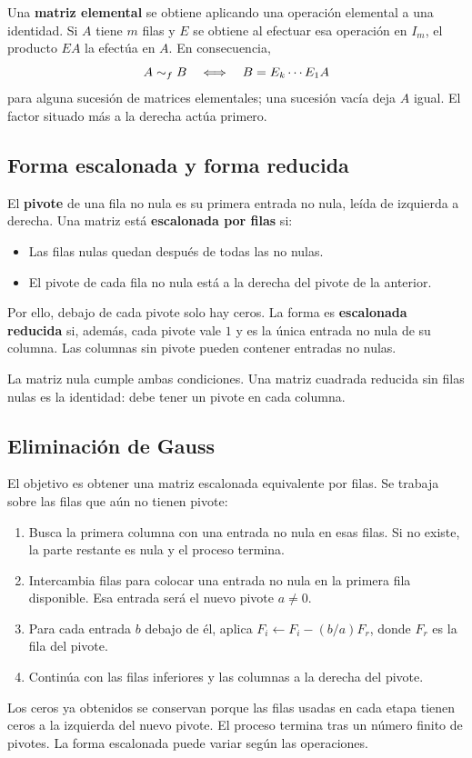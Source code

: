Una \textbf{matriz elemental} se obtiene aplicando una operación elemental
a una identidad. Si $A$ tiene $m$ filas y $E$ se obtiene al efectuar
esa operación en $I_m$, el producto $EA$ la efectúa en $A$.
En consecuencia,
\[
 A\sim_f B\quad\Longleftrightarrow\quad B=E_k\cdots E_1A
\]
para alguna sucesión de matrices elementales; una sucesión vacía deja $A$
igual. El factor situado más a la derecha actúa primero.

\subsection*{Forma escalonada y forma reducida}
\label{sec:escalonada}

El \textbf{pivote} de una fila no nula es su primera entrada no nula,
leída de izquierda a derecha. Una matriz está \textbf{escalonada por filas} si:
\begin{itemize}
 \item Las filas nulas quedan después de todas las no nulas.
 \item El pivote de cada fila no nula está a la derecha del pivote de la anterior.
\end{itemize}
Por ello, debajo de cada pivote solo hay ceros. La forma es
\textbf{escalonada reducida} si, además, cada pivote vale $1$ y es la única
entrada no nula de su columna. Las columnas sin pivote pueden contener
entradas no nulas.

La matriz nula cumple ambas condiciones. Una matriz cuadrada reducida
sin filas nulas es la identidad: debe tener un pivote en cada columna.

\subsection*{Eliminación de Gauss}

El objetivo es obtener una matriz escalonada equivalente por filas.
Se trabaja sobre las filas que aún no tienen pivote:
\begin{enumerate}
 \item Busca la primera columna con una entrada no nula en esas filas.
       Si no existe, la parte restante es nula y el proceso termina.
 \item Intercambia filas para colocar una entrada no nula en la primera
       fila disponible. Esa entrada será el nuevo pivote $a\ne0$.
 \item Para cada entrada $b$ debajo de él, aplica
       $F_i\leftarrow F_i-(b/a)F_r$, donde $F_r$ es la fila del pivote.
 \item Continúa con las filas inferiores y las columnas a la derecha del pivote.
\end{enumerate}
Los ceros ya obtenidos se conservan porque las filas usadas en cada etapa
tienen ceros a la izquierda del nuevo pivote. El proceso termina tras un
número finito de pivotes. La forma escalonada puede variar según las operaciones.

